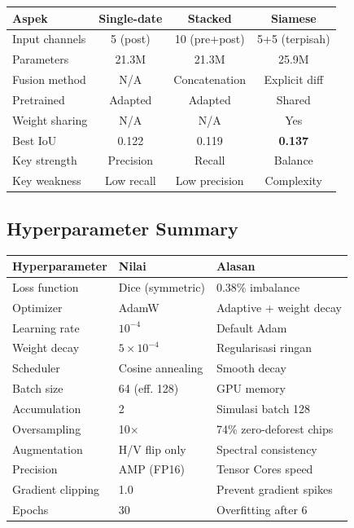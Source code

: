 \documentclass[10pt,a4paper,onecolumn]{article}
\begin{document}
\begin{table}[ht]
\centering
\small
\begin{tabular}{lccc}
\toprule
\textbf{Aspek} & \textbf{Single-date} & \textbf{Stacked} & \textbf{Siamese} \\
\midrule
Input channels & 5 (post) & 10 (pre+post) & 5+5 (terpisah) \\
Parameters & 21.3M & 21.3M & 25.9M \\
Fusion method & N/A & Concatenation & Explicit diff \\
Pretrained & Adapted & Adapted & Shared \\
Weight sharing & N/A & N/A & Yes \\
Best IoU & 0.122 & 0.119 & \textbf{0.137} \\
Key strength & Precision & Recall & Balance \\
Key weakness & Low recall & Low precision & Complexity \\
\bottomrule
\end{tabular}
\end{table}

\subsection*{Hyperparameter Summary}

\begin{table}[ht]
\centering
\small
\begin{tabular}{lll}
\toprule
\textbf{Hyperparameter} & \textbf{Nilai} & \textbf{Alasan} \\
\midrule
Loss function & Dice (symmetric) & 0.38\% imbalance \\
Optimizer & AdamW & Adaptive + weight decay \\
Learning rate & $10^{-4}$ & Default Adam \\
Weight decay & $5 \times 10^{-4}$ & Regularisasi ringan \\
Scheduler & Cosine annealing & Smooth decay \\
Batch size & 64 (eff. 128) & GPU memory \\
Accumulation & 2 & Simulasi batch 128 \\
Oversampling & 10$\times$ & 74\% zero-deforest chips \\
Augmentation & H/V flip only & Spectral consistency \\
Precision & AMP (FP16) & Tensor Cores speed \\
Gradient clipping & 1.0 & Prevent gradient spikes \\
Epochs & 30 & Overfitting after 6 \\
\bottomrule
\end{tabular}
\end{table}
\end{document}
